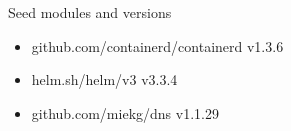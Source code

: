 \begin{table}[ht]
  \caption{Seed modules and versions}
  \label{table:seed}
  \begin{itemize}
  \item github.com/containerd/containerd v1.3.6
  \item helm.sh/helm/v3 v3.3.4
  \item github.com/miekg/dns v1.1.29


  \end{itemize}
\end{table}
